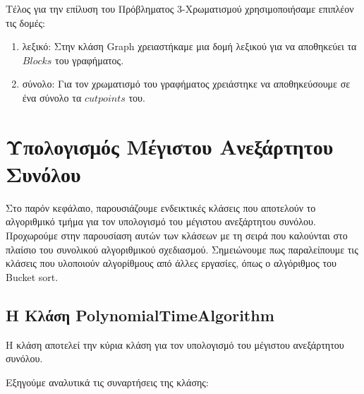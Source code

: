 Τέλος για την επίλυση του Πρόβληματος 3-Χρωματισμού χρησιμοποιήσαμε επιπλέον τις δομές:
 
\begin{enumerate}
	\item λεξικό: Στην κλάση Graph χρειαστήκαμε μια δομή λεξικού για να αποθηκεύει τα $Blocks$ του γραφήματος.
	
	\item σύνολο: Για τον χρωματισμό του γραφήματος χρειάστηκε να αποθηκεύσουμε σε ένα σύνολο τα $cutpoints$ του.
\end{enumerate}

\section{Υπολογισμός Μέγιστου Ανεξάρτητου Συνόλου}
\label{sec:Impl-Independent-set}

Στο παρόν κεφάλαιο, παρουσιάζουμε ενδεικτικές κλάσεις που αποτελούν το αλγοριθμικό τμήμα για τον υπολογισμό του μέγιστου ανεξάρτητου συνόλου. Προχωρούμε στην παρουσίαση αυτών των κλάσεων με τη σειρά που καλούνται στο πλαίσιο του συνολικού αλγοριθμικού σχεδιασμού. Σημειώνουμε πως παραλείπουμε τις κλάσεις που υλοποιούν αλγορίθμους από άλλες εργασίες, όπως ο αλγόριθμος του Bucket sort.



\subsection{H Kλάση PolynomialTimeAlgorithm}
\label{subsec:PolynomialTimeAlgorithm-IndependentSet}
Η κλάση  αποτελεί την κύρια κλάση για τον υπολογισμό του μέγιστου ανεξάρτητου συνόλου.





Εξηγούμε αναλυτικά τις συναρτήσεις της κλάσης:

